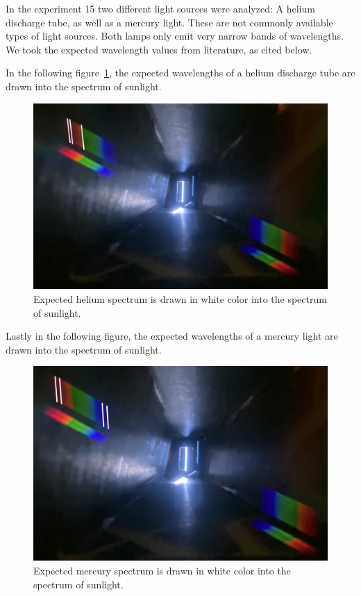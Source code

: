 In the experiment 15 two different light sources were analyzed: A helium discharge tube, as well as
a mercury light. These are not commonly available types of light sources. Both lamps only emit very narrow bands
of wavelengths. We took the expected wavelength values from literature, as cited below.

In the following figure~\ref{fig_helium_spectrum}, the expected wavelengths of a helium discharge tube are 
drawn into the spectrum of sunlight. \cite{Helium Discharge Tube}
\begin{figure}[H]
    \centering
    \includegraphics[scale = 0.23]{src/images/helium_spectrum.jpg}
    \caption{Expected helium spectrum is drawn in white color into the spectrum of sunlight.}
    \label{fig_helium_spectrum}
\end{figure}
\vspace{-1em}
Lastly in the following figure, the expected wavelengths of a mercury light are drawn into the spectrum of sunlight.
\cite{Mercury Vapor Lamp}
\begin{figure}[H]
    \centering
    \includegraphics[scale = 0.2]{src/images/mercury_spectrum.jpg}
    \caption{Expected mercury spectrum is drawn in white color into the spectrum of sunlight.}
    \label{fig_mercury_spectrum}
\end{figure}